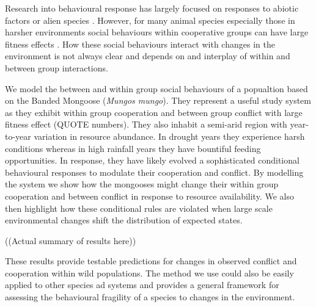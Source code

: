 Research into behavioural response has largely focused on responses to abiotic factors or alien species \parencite{wongBehavioralResponsesChanging2015}. However, for many animal species especially those in harsher environments social behaviours within cooperative groups can have large fitness effects \parencite{downingGroupFormationEvolutionary2020}. How these social behaviours interact with changes in the environment is not always clear and depends on and interplay of within and between group interactions. 

We model the between and within group social behaviours of a popualtion based on the Banded Mongoose (\textit{Mungos mungo}). They represent a useful study system as they exhibit within group cooperation and between group conflict with large fitness effect (QUOTE numbers). They also inhabit a semi-arid region with year-to-year variation in resource abundance. In drought years they experience harsh conditions whereas in high rainfall years they have bountiful feeding opportunities. In response, they have likely evolved a sophisticated conditional behavioural responses to modulate their cooperation and conflict. By modelling the system we show how the mongooses might change their within group cooperation and between conflict in response to resource availability. We also then highlight how these conditional rules are violated when large scale environmental changes shift the distribution of expected states. 

((Actual summary of results here))

These results provide testable predictions for changes in observed conflict and cooperation within wild populations. The method we use could also be easily applied to other species ad systems and provides a general framework for assessing the behavioural fragility of a species to changes in the environment. 
